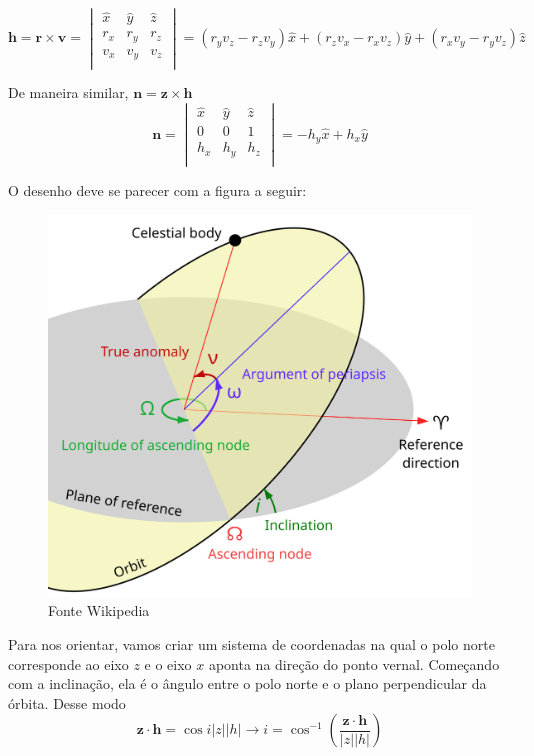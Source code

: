 \documentclass[11pt]{article}
\begin{document}
\begin{pproblem}
\begin{pssolution*}{}{}
\begin{alternativas}
            $$\mathbf{h}=\mathbf{r}\times\mathbf{v} = 
            \begin{vmatrix}
                \hat{x} & \hat{y} & \hat{z} \\
                r_x & r_y & r_z \\
                v_x & v_y & v_z \\
            \end{vmatrix}
            = (r_yv_z - r_zv_y)\hat{x} + (r_zv_x-r_xv_z)\hat{y} + (r_xv_y-r_yv_z)\hat{z}   $$

            De maneira similar, $\mathbf{n} = \mathbf{z}\times\mathbf{h}$
            $$\mathbf{n} = 
            \begin{vmatrix}
                \hat{x} & \hat{y} & \hat{z} \\
                0 & 0 & 1 \\
                h_x & h_y & h_z \\
            \end{vmatrix}
             = -h_y\hat{x} + h_x\hat{y}$$

             \item O desenho deve se parecer com a figura a seguir:
             \begin{figure}[H]
                \centering
                \includegraphics[width=0.7\linewidth]{imagens/elementosorbitais.png}
                \caption{Fonte Wikipedia}
            \end{figure}

            \item Para nos orientar, vamos criar um sistema de coordenadas na qual o polo norte corresponde ao eixo $z$ e o eixo $x$ aponta na direção do ponto vernal. Começando com a inclinação, ela é o ângulo entre o polo norte e o plano perpendicular da órbita. Desse modo
            $$\mathbf{z}\cdot\mathbf{h} = \cos i |z||h|\rightarrow i = \cos^{-1}\left(\frac{\mathbf{z}\cdot\mathbf{h}}{|z||h|}\right) $$


\end{alternativas}
\end{pssolution*}
\end{pproblem}
\end{document}
